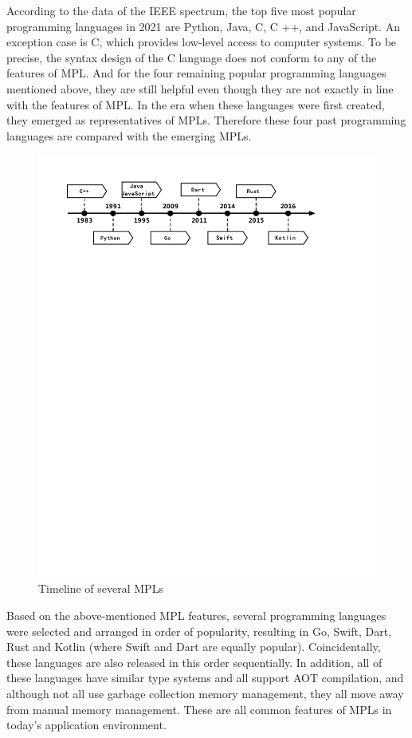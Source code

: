 According to the data of the IEEE spectrum\cite{IEEETopProgrammingLanguages},
the top five most popular programming languages in 2021 are Python, Java, C, C ++, and JavaScript. An exception case is C, which provides low-level access to computer systems. To be precise, the syntax design of the C language does not conform to any of the features of MPL. And for the four remaining popular programming languages mentioned above, they are still helpful even though they are not exactly in line with the features of MPL. In the era when these languages were first created, they emerged as representatives of MPLs. Therefore these four past programming languages are compared with the emerging MPLs.

\begin{figure}[htbp]
    \centerline{\includegraphics[scale=0.6]{figures/timeline}}
    \caption{Timeline of several MPLs}
    \label{fig:timeline}
\end{figure}


Based on the above-mentioned MPL features,
several programming languages were selected and arranged
in order of popularity\cite{IEEETopProgrammingLanguages},
resulting in Go, Swift, Dart, Rust and Kotlin (where Swift and Dart are equally popular). Coincidentally, these languages are also released in this order sequentially. In addition, all of these languages have similar type systems and all support AOT compilation, and although not all use garbage collection memory management, they all move away from manual memory management. These are all common features of MPLs in today's application environment.

